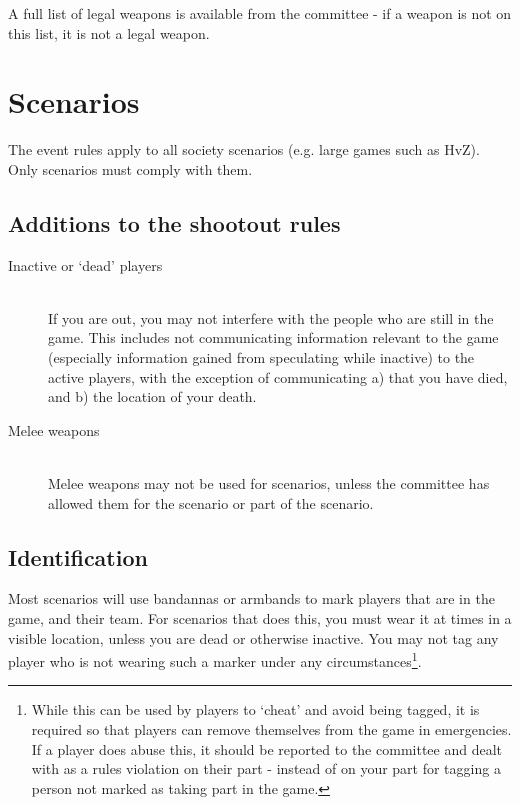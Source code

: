 \documentclass{report}
\begin{document}
	\noindent A full list of legal weapons is available from the committee - if a weapon is not on this list, it is not a legal weapon.

\section{Scenarios}

The event rules apply to all society scenarios (e.g. large games such as HvZ). Only scenarios must comply with them.

	\subsection{Additions to the shootout rules}
	
	\begin{description}
		\item[Inactive or `dead' players] \hfill \\ If you are out, you may not interfere with the people who are still in the game. This includes not communicating information relevant to the game (especially information gained from speculating while inactive) to the active players, with the exception of communicating a) that you have died, and b) the location of your death.
		
		\item[Melee weapons]  \hfill \\ Melee weapons may not be used for scenarios, unless the committee has allowed them for the scenario or part of the scenario.
    \end{description}
    
    \subsection{Identification}
	
	Most scenarios will use bandannas or armbands to mark players that are in the game, and their team. For scenarios that does this, you must wear it at times in a visible location, unless you are dead or otherwise inactive. You may not tag any player who is not wearing such a marker under any circumstances\footnote{While this can be used by players to `cheat' and avoid being tagged, it is required so that players can remove themselves from the game in emergencies. If a player does abuse this, it should be reported to the committee and dealt with as a rules violation on their part - instead of on your part for tagging a person not marked as taking part in the game.}.
	
\end{document}
